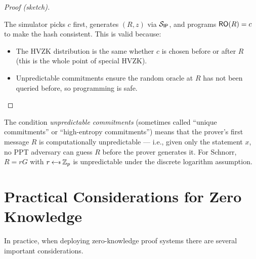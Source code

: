 \documentclass[11pt]{article}
\begin{document}
\begin{proof}[Proof (sketch)]
\begin{center}
\end{center}

\noindent The simulator picks $c$ first, generates $(R,z)$ via
$\mathcal{S}_{\mathsf{IP}}$, and programs $\mathsf{RO}(R)=c$ to make the
hash consistent.  This is valid because:
\begin{itemize}
  \item The HVZK distribution is the same whether $c$ is chosen before
        or after $R$ (this is the whole point of special HVZK).
  \item Unpredictable commitments ensure the random oracle at $R$
        has not been queried before, so programming is safe.
\end{itemize}
\end{proof}

\begin{remark}
The condition \emph{unpredictable commitments} (sometimes called
``unique commitments'' or ``high-entropy commitments'') means that
the prover's first message $R$ is computationally unpredictable ---
i.e., given only the statement $x$, no PPT adversary can guess $R$
before the prover generates it.  For Schnorr, $R = rG$ with $r
\getsr \mathbb{Z}_p$ is unpredictable under the discrete logarithm
assumption.
\end{remark}

\section{Practical Considerations for Zero Knowledge}

In practice, when deploying zero-knowledge proof systems there are
several important considerations.
\end{document}
